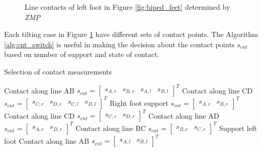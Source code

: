 \begin{figure}[H]
	
	\caption{Line contacts of left foot in Figure \ref{fig:biped_feet} determined by \emph{ZMP}}
	\label{fig:zmp_cases}
\end{figure}

Each tilting case in Figure \ref{fig:zmp_cases} have different sets of contact points. The Algorithm \ref{alg:cnt_switch} is useful in making the decision about the contact points $s_{cnt}$ based on number of support and state of contact.
\begin{algorithm}
    \caption{Selection of contact measurements}
    \label{alg:cnt_switch}
    \begin{algorithmic}
        \STATE Contact along line AB
        \RETURN $ s_{cnt}= \begin{bmatrix}s_{A,r} &s_{B,r} &s_{A,l} &s_{B,l} \end{bmatrix}^T$ 
        \STATE Contact along line CD
        \RETURN $ s_{cnt}= \begin{bmatrix}s_{C,r} &s_{D,r} &s_{C,l} &s_{D,l} \end{bmatrix}^T$ 
        \ENDIF
    \STATE Right foot support
        \RETURN $ s_{cnt}= \begin{bmatrix}s_{A,r} &s_{B,r}  \end{bmatrix}^T$ 
        \STATE Contact along line CD
        \RETURN $ s_{cnt}= \begin{bmatrix}s_{C,r} &s_{D,r}  \end{bmatrix}^T$ 
        \STATE Contact along line AD
        \RETURN $ s_{cnt}= \begin{bmatrix}s_{A,r} &s_{D,r}  \end{bmatrix}^T$ 
        \STATE Contact along line BC
        \RETURN $ s_{cnt}= \begin{bmatrix}s_{B,r} &s_{C,r}  \end{bmatrix}^T$ 
        \ENDIF
    \STATE Support left foot
        \STATE Contact along line AB
        \RETURN $ s_{cnt}= \begin{bmatrix} s_{A,l} &s_{B,l} \end{bmatrix}^T$ 

\end{algorithmic}
\end{algorithm}
